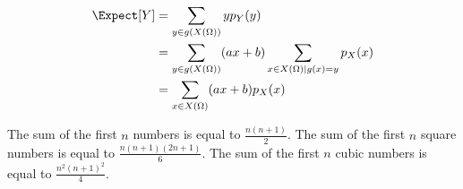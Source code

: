 \begin{equation*}
\begin{split}
\Expect [Y] &= \sum_{y \in g(X(\Omega))} y p_Y(y) \\
&= \sum_{y \in g(X(\Omega))} (ax + b) \sum_{x \in X(\Omega) | g(x) = y} p_X(x) \\
&= \sum_{x \in X(\Omega)} (ax + b) p_X(x)
\end{split}
\end{equation*}


The sum of the first $n$ numbers is equal to $\frac{n (n+1)}{2}$.
The sum of the first $n$ square numbers is equal to $\frac{n (n+1)(2n + 1)}{6}$.
The sum of the first $n$ cubic numbers is equal to $\frac{n^2 (n+1)^2}{4}$.

